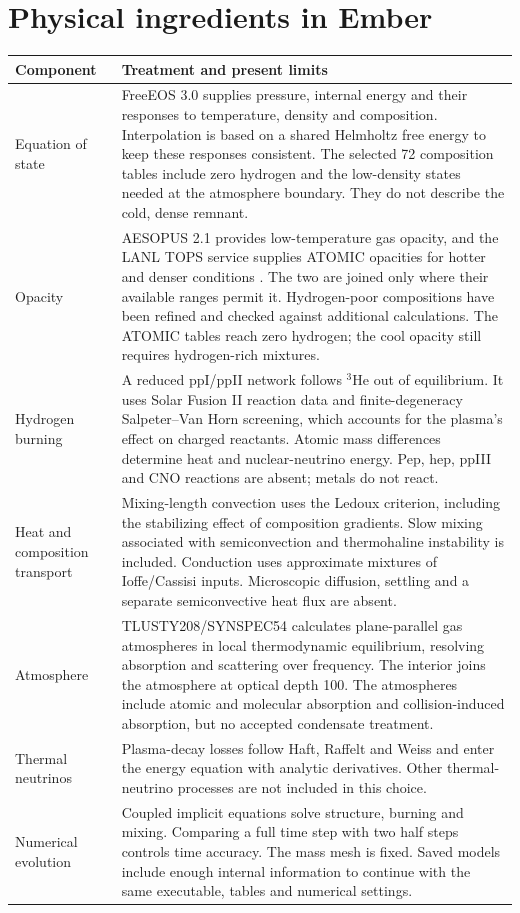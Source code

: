\documentclass[11pt,letterpaper]{article}
\begin{document}
\section{Physical ingredients in Ember}
\begin{longtable}{@{}>{\raggedright\arraybackslash}p{}>{\raggedright\arraybackslash}p{}@{}}
\toprule Component & Treatment and present limits \\\midrule\endhead
Equation of state & FreeEOS 3.0 supplies pressure, internal energy and their
responses to temperature, density and composition. Interpolation is based on
a shared Helmholtz free energy to keep these responses consistent. The selected
72 composition tables include zero hydrogen and the low-density states
needed at the atmosphere boundary. They do not describe the cold, dense remnant. \\[5pt]
Opacity & AESOPUS 2.1 provides low-temperature gas opacity, and the LANL TOPS
service supplies ATOMIC opacities for hotter and denser conditions
\cite{colgan16,tops}. The two are joined only where their
available ranges permit it. Hydrogen-poor compositions have been refined and
checked against additional calculations. The ATOMIC tables reach
zero hydrogen; the cool opacity still requires hydrogen-rich mixtures. \\[5pt]
Hydrogen burning & A reduced ppI/ppII network follows $^3$He out of equilibrium.
It uses Solar Fusion II reaction data and finite-degeneracy
Salpeter--Van Horn screening, which accounts for the plasma's effect on charged
reactants. Atomic mass differences determine heat and nuclear-neutrino energy.
Pep, hep, ppIII and CNO reactions are absent; metals do not react. \\[5pt]
Heat and composition transport & Mixing-length convection uses the Ledoux
criterion, including the stabilizing effect of composition gradients. Slow
mixing associated with semiconvection and thermohaline instability is included.
Conduction uses approximate mixtures of Ioffe/Cassisi inputs. Microscopic
diffusion, settling and a separate semiconvective heat flux are absent. \\[5pt]
Atmosphere & TLUSTY208/SYNSPEC54 calculates plane-parallel gas atmospheres in
local thermodynamic equilibrium, resolving absorption and scattering over
frequency. The interior joins the atmosphere at optical depth 100. The
atmospheres include atomic and molecular absorption and collision-induced
absorption, but no accepted condensate treatment. \\[5pt]
Thermal neutrinos & Plasma-decay losses follow Haft, Raffelt and Weiss
\cite{hrw94} and enter the energy equation with analytic derivatives. Other
thermal-neutrino processes are not included in this choice. \\[5pt]
Numerical evolution & Coupled implicit equations solve structure, burning and
mixing. Comparing a full time step with two half steps controls time accuracy.
The mass mesh is fixed. Saved models include enough internal information to
continue with the same executable, tables and numerical settings. \\
\bottomrule\end{longtable}
\end{document}
